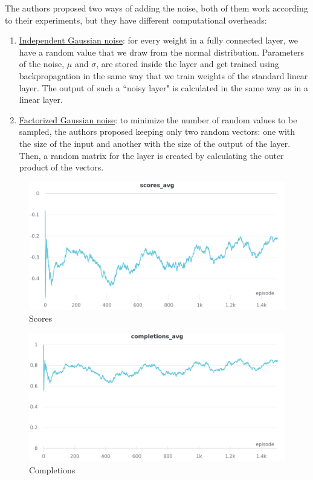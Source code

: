 \documentclass[12pt]{article}
\begin{document}
The authors proposed two ways of adding the noise, both of them work according to their experiments,
but they have different computational overheads:
\begin{enumerate}
    \item \underline{Independent Gaussian noise}: for every weight in a fully connected layer, we have a random
    value that we draw from the normal distribution. Parameters of the noise, $\mu$ and $\sigma$, are stored
    inside the layer and get trained using backpropagation in the same way that we train weights of the
    standard linear layer. The output of such a ``noisy layer" is calculated in the same way as in a linear layer.
    \item \underline{Factorized Gaussian noise}: to minimize the number of random values to be sampled, the
    authors proposed keeping only two random vectors: one with the size of the input and another
    with the size of the output of the layer. Then, a random matrix for the layer is created by
    calculating the outer product of the vectors.
\end{enumerate}

\begin{figure}[H]
        \centerline{\includegraphics[scale=.2]{res/charts/noisy_scores.png}}
        \caption{Scores}
\end{figure}

\begin{figure}[H]
        \centerline{\includegraphics[scale=.2]{res/charts/noisy_completions.png}}
        \caption{Completions}
\end{figure}
\end{document}
